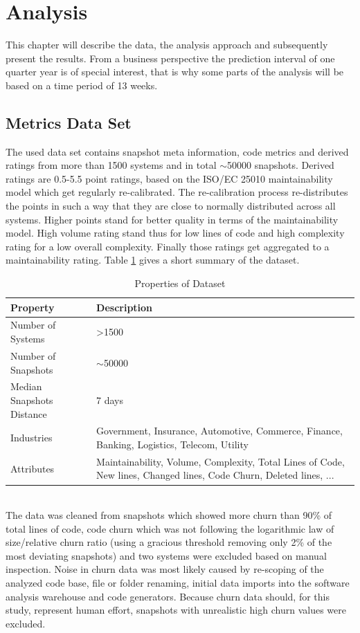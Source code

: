 \section{Analysis}
\label{sec:analysis}
This chapter will describe the data, the analysis approach and subsequently present the results. From a business perspective the prediction interval of one quarter year is of special interest, that is why some parts of the analysis will be based on a time period of 13 weeks.

\subsection{Metrics Data Set}
The used data set contains snapshot meta information, code metrics and derived ratings from more than 1500 systems and in total $\sim$50000 snapshots. Derived ratings are 0.5-5.5 point ratings, based on the ISO/EC 25010 maintainability model which get regularly re-calibrated. The re-calibration process re-distributes the points in such a way that they are close to normally distributed across all systems. Higher points stand for better quality in terms of the maintainability model. High volume rating stand thus for low lines of code and high complexity rating for a low overall complexity. Finally those ratings get aggregated to a maintainability rating. Table \ref{system} gives a short summary of the dataset. 
\begin{table}[htbp!]
\caption{Properties of Dataset}
\begin{tabular}{ l  p{4.8cm} }
  \hline			
  Property & Description \\ \hline
  Number of Systems & \textgreater1500 \\ 
  Number of Snapshots & $\sim$50000\\ 
  Median Snapshots Distance & 7 days\\ 
  Industries & Government, Insurance, Automotive, Commerce, Finance, Banking, Logistics, Telecom, Utility\\
  Attributes & Maintainability, Volume, Complexity, Total Lines of Code, New lines, Changed lines, Code Churn, Deleted lines, ...\\ \hline
\end{tabular}
\label{system}
\end{table}\\
The data was cleaned from snapshots which showed more churn than 90\% of total lines of code, code churn which was not following the logarithmic law of size/relative churn ratio (using a gracious threshold removing only 2\% of the most deviating snapshots) and two systems were excluded based on manual inspection. Noise in churn data was most likely caused by re-scoping of the analyzed code base, file or folder renaming, initial data imports into the software analysis warehouse and code generators. Because churn data should, for this study, represent human effort, snapshots with unrealistic high churn values were excluded.

